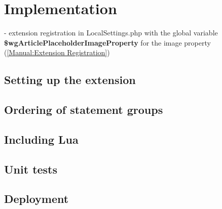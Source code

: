 	\section{Implementation}
	
	- extension registration in LocalSettings.php with the global variable \textbf{\$wgArticlePlaceholderImageProperty} for the image property (\href{https://www.mediawiki.org/wiki/Manual:Extension_registration}{[Manual:Extension Registration]})\\
	\subsection{Setting up the extension}
	
	
	
	\subsection{Ordering of statement groups}
	\subsection{Including Lua}
	
	\subsection{Unit tests}
	\subsection{Deployment}
	